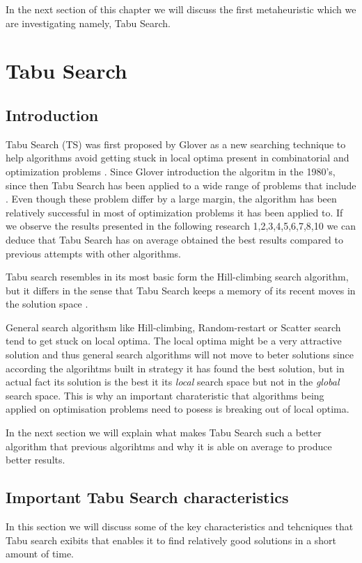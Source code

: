In the next section of this chapter we will discuss the first metaheuristic which we are investigating namely, Tabu Search.
\section{Tabu Search}
\subsection{Introduction}
Tabu Search (TS) was first proposed by Glover as a new searching technique to help algorithms avoid getting  stuck in local optima present in combinatorial and optimization problems \cite{TabuRCAProblem}. Since Glover introduction the algoritm in the 1980's, since then Tabu Search has been applied to a wide range of problems that include \cite{TabuVechicleRoutingWithTimeWindows}. Even though these problem differ by a large margin, the algorithm has been relatively successful in most of optimization problems it has been applied to. If we observe the results presented in the following research 1,2,3,4,5,6,7,8,10 we can deduce that Tabu Search has on average obtained the best results compared to previous attempts with other algorithms. 

Tabu search resembles in its most basic form the Hill-climbing search algorithm, but it differs in the sense that Tabu Search keeps a memory of its recent moves in the solution space \cite{TabuBiddingStrats}. 

General search algorithsm like Hill-climbing, Random-restart or Scatter search tend to get stuck on local optima. The local optima might be a very attractive solution and thus general search algorithms will not move to beter solutions since according the algorihtms built in strategy it has found the best solution, but in actual fact its solution is the best it its \emph{local} search space but not in the \emph{global} search space. This is why an important charateristic that algorithms being applied on optimisation problems need to posess is breaking out of local optima.

In the next section we will explain what makes Tabu Search such a better algorithm that previous algorihtms and why it is able on average to produce better results.

\subsection{Important Tabu Search characteristics}
In this section we will discuss some of the key characteristics and tehcniques that Tabu search exibits that enables it to find relatively good solutions in a short amount of time.

